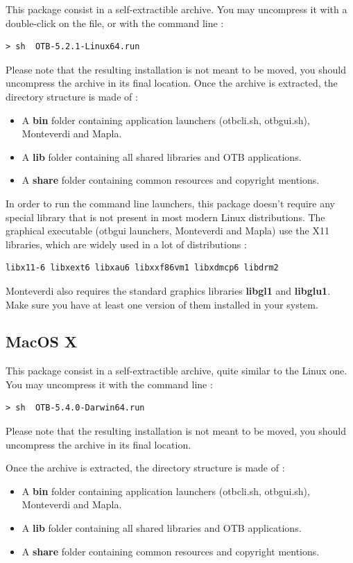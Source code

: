 This package consist in a self-extractible archive. You may uncompress it with a
double-click on the file, or with the command line :
\begin{verbatim}
> sh  OTB-5.2.1-Linux64.run
\end{verbatim}

Please note that the resulting installation is not meant to be moved, you should
uncompress the archive in its final location. Once the archive is extracted, 
the directory structure is made of :
\begin{itemize}
\item A \textbf{bin} folder containing application launchers (otbcli\textunderscore *.sh,
otbgui\textunderscore *.sh), Monteverdi and Mapla.
\item A \textbf{lib} folder containing all shared libraries and OTB applications.
\item A \textbf{share} folder containing common resources and copyright mentions.
\end{itemize}

In order to run the command line launchers, this package doesn't require any special
library that is not present in most modern Linux distributions. The graphical
executable (otbgui launchers, Monteverdi and Mapla) use the X11 libraries, which
are widely used in a lot of distributions :
\begin{verbatim}
libx11-6 libxext6 libxau6 libxxf86vm1 libxdmcp6 libdrm2
\end{verbatim}
Monteverdi also requires the standard graphics libraries \textbf{libgl1} and
\textbf{libglu1}. Make sure you have at least one version of them installed in
your system.

\subsection{MacOS X}

This package consist in a self-extractible archive, quite similar to the Linux
one. You may uncompress it with the command line :
\begin{verbatim}
> sh  OTB-5.4.0-Darwin64.run
\end{verbatim}

Please note that the resulting installation is not meant to be moved, you should
uncompress the archive in its final location.

Once the archive is extracted, the directory structure is made of :
\begin{itemize}
\item A \textbf{bin} folder containing application launchers (otbcli\textunderscore *.sh,
otbgui\textunderscore *.sh), Monteverdi and Mapla.
\item A \textbf{lib} folder containing all shared libraries and OTB applications.
\item A \textbf{share} folder containing common resources and copyright mentions.
\end{itemize}

